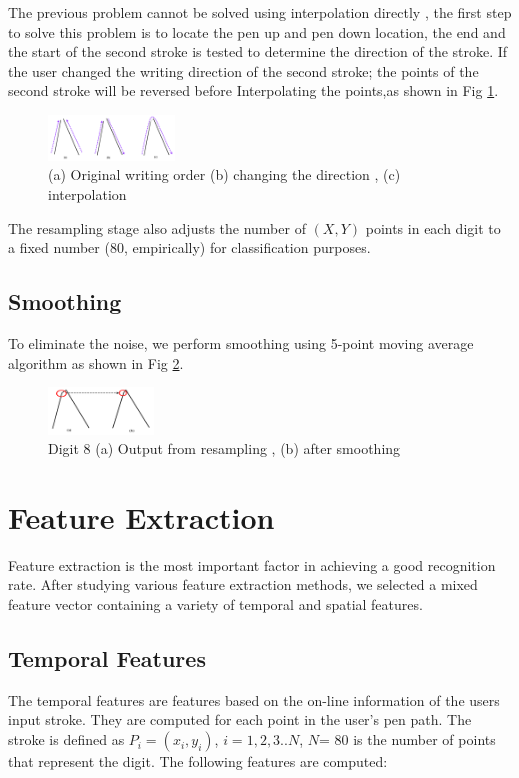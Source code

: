 \documentclass[times, 10pt,twocolumn]{article}
\begin{document}
The previous problem cannot be solved using interpolation directly , the first step to solve this problem is to locate the pen up and pen down location, the end and the start of the second stroke is tested to determine the direction of the stroke. If the user changed the writing direction of the second stroke; the points of the second stroke will be reversed before Interpolating the points,as shown in Fig \ref{fig:pre4}.

 \begin{figure}
 \centering
 \includegraphics[width=0.3\textwidth]{pre4}
 \caption{(a) Original writing order (b) changing the direction , (c) interpolation }
\label{fig:pre4} \end{figure}
The resampling stage also adjusts the number of $(X,Y)$  points in each digit to a fixed number (80, empirically) for classification purposes.

 \subsection{Smoothing}
To eliminate the noise, we perform smoothing using 5-point moving average algorithm \cite{Matlab} as shown in Fig \ref{fig:pre55}.

 \begin{figure}
 \centering
 \includegraphics[width=0.25\textwidth]{pre5}
 \caption{Digit 8 (a)	Output from resampling , (b) after smoothing}
\label{fig:pre55}
 \end{figure}


\section{Feature Extraction}
\label{sec:FeatureExtraction}
Feature extraction is the most important factor in achieving a good recognition rate. After studying various feature extraction methods, we selected a mixed feature vector containing a variety of temporal and spatial  features.


\subsection{Temporal Features}
\label{sec:temporal}
The temporal features are features based on the on-line information of the users input stroke. They are computed for each point in the user's pen path. The stroke is defined as  $P_i=(x_i,y_i)$, $i=1, 2, 3..N$,  $N$= 80 is the number of points that represent the digit.  The following features are computed:
\end{document}
